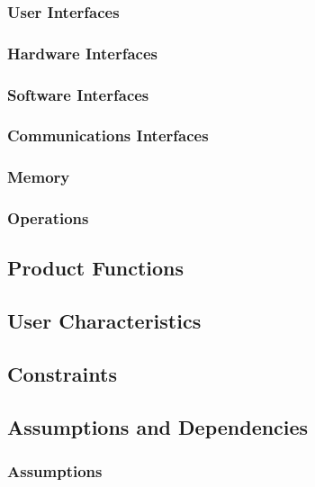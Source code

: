 \documentclass[english]{article}
\begin{document}
				\subsubsection{User Interfaces}
						

				\subsubsection{Hardware Interfaces}
				   
				\subsubsection{Software Interfaces}
			
				\subsubsection{Communications Interfaces}
			
				\subsubsection{Memory}

				\subsubsection{Operations}

				\subsection{Product Functions}

				\subsection{User Characteristics}
				
			
				\subsection{Constraints}
            

				\subsection{Assumptions and Dependencies}
				\subsubsection{Assumptions}
\end{document}
